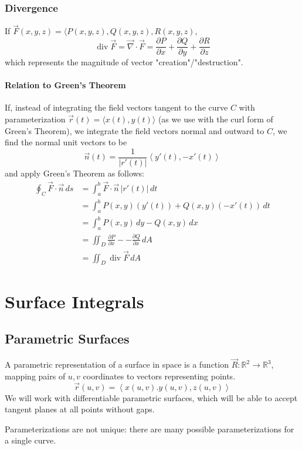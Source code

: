 \documentclass{article}
\DeclareMathOperator{\divergence}{div}
\newcommand{\vect}[1]{\ensuremath{\overrightarrow{#1}}}
\begin{document}
\subsubsection{Divergence}
If $\vect{F}(x,y,z)=\langle P(x,y,z), Q(x,y,z), R(x,y,z)$,
$$\divergence \vect{F} = \vect{\nabla}\cdot\vect{F}= \frac{\partial P}{\partial x} + \frac{\partial Q}{\partial y} + \frac{\partial R}{\partial z}$$
which represents the magnitude of vector "creation"/"destruction".

\paragraph{Relation to Green's Theorem}
If, instead of integrating the field vectors tangent to the curve $C$ with parameterization $\vect{r}(t) = \langle x(t), y(t)\rangle$ (as we use with the curl form of Green's Theorem), we integrate the field vectors normal and outward to $C$, we find the normal unit vectors to be
$$\vect{n}(t) = \frac{1}{|r'(t)|}\left\langle y'(t), -x'(t)\right\rangle$$ and apply Green's Theorem as follows:
\begin{align*}
    \oint_C \vect{F}\cdot\vect{n}\,ds&=\int_a^b \vect{F}\cdot\vect{n}\,|r'(t)|\,dt\\
    &=\int_a^b P(x,y)(y'(t))+Q(x,y)(-x'(t))\,dt\\
    &=\int_a^b P(x,y)\,dy-Q(x,y)\,dx\\
    &=\iint_D \frac{\partial P}{\partial x} --\frac{\partial Q}{\partial x}\,dA\\
    &=\iint_D \divergence\vect{F}\,dA
\end{align*}

\section{Surface Integrals}
\subsection{Parametric Surfaces}
A parametric representation of a surface in space is a function $\vect{R}:\mathbb{R}^2\to\mathbb{R}^3$, mapping pairs of $u,v$ coordinates to vectors representing points.
$$\vect{r}(u,v)=\left\langle x(u,v).y(u,v), z(u,v) \right\rangle$$
We will work with differentiable parametric surfaces, which will be able to accept tangent planes at all points without gaps.

Parameterizations are not unique: there are many possible parameterizations for a single curve.
\end{document}
